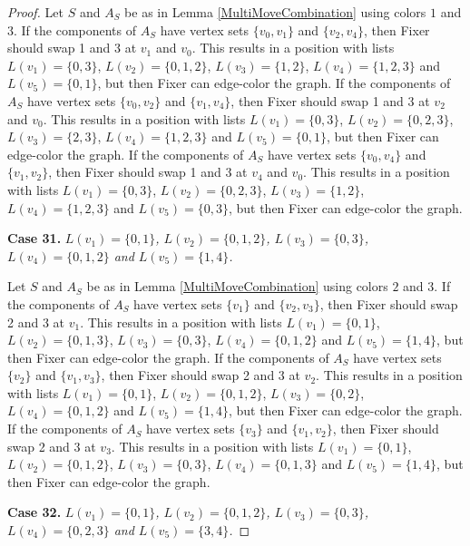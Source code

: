 \documentclass[12pt]{amsart}
\theoremstyle{plain}
\theoremstyle{definition}
\theoremstyle{remark}
\begin{document}
\begin{proof}
Let $S$ and $A_S$ be as in Lemma \ref{MultiMoveCombination} using colors $1$ and $3$. If the components of $A_S$ have vertex sets $\{v_0, v_1\}$ and $\{v_2, v_4\}$, then Fixer should swap 1 and 3 at $v_1$ and $v_0$. This results in a position with lists $L(v_1) = \{0, 3\}$, $L(v_2) = \{0, 1, 2\}$, $L(v_3) = \{1, 2\}$, $L(v_4) = \{1, 2, 3\}$ and $L(v_5) = \{0, 1\}$, but then Fixer can edge-color the graph.
If the components of $A_S$ have vertex sets $\{v_0, v_2\}$ and $\{v_1, v_4\}$, then Fixer should swap 1 and 3 at $v_2$ and $v_0$. This results in a position with lists $L(v_1) = \{0, 3\}$, $L(v_2) = \{0, 2, 3\}$, $L(v_3) = \{2, 3\}$, $L(v_4) = \{1, 2, 3\}$ and $L(v_5) = \{0, 1\}$, but then Fixer can edge-color the graph.
If the components of $A_S$ have vertex sets $\{v_0, v_4\}$ and $\{v_1, v_2\}$, then Fixer should swap 1 and 3 at $v_4$ and $v_0$. This results in a position with lists $L(v_1) = \{0, 3\}$, $L(v_2) = \{0, 2, 3\}$, $L(v_3) = \{1, 2\}$, $L(v_4) = \{1, 2, 3\}$ and $L(v_5) = \{0, 3\}$, but then Fixer can edge-color the graph.

\noindent\textbf{Case 31.  }\textit{$L(v_1) = \{0, 1\}$, $L(v_2) = \{0, 1, 2\}$, $L(v_3) = \{0, 3\}$, $L(v_4) = \{0, 1, 2\}$ and $L(v_5) = \{1, 4\}$.}

Let $S$ and $A_S$ be as in Lemma \ref{MultiMoveCombination} using colors $2$ and $3$. If the components of $A_S$ have vertex sets $\{v_1\}$ and $\{v_2, v_3\}$, then Fixer should swap 2 and 3 at $v_1$. This results in a position with lists $L(v_1) = \{0, 1\}$, $L(v_2) = \{0, 1, 3\}$, $L(v_3) = \{0, 3\}$, $L(v_4) = \{0, 1, 2\}$ and $L(v_5) = \{1, 4\}$, but then Fixer can edge-color the graph.
If the components of $A_S$ have vertex sets $\{v_2\}$ and $\{v_1, v_3\}$, then Fixer should swap 2 and 3 at $v_2$. This results in a position with lists $L(v_1) = \{0, 1\}$, $L(v_2) = \{0, 1, 2\}$, $L(v_3) = \{0, 2\}$, $L(v_4) = \{0, 1, 2\}$ and $L(v_5) = \{1, 4\}$, but then Fixer can edge-color the graph.
If the components of $A_S$ have vertex sets $\{v_3\}$ and $\{v_1, v_2\}$, then Fixer should swap 2 and 3 at $v_3$. This results in a position with lists $L(v_1) = \{0, 1\}$, $L(v_2) = \{0, 1, 2\}$, $L(v_3) = \{0, 3\}$, $L(v_4) = \{0, 1, 3\}$ and $L(v_5) = \{1, 4\}$, but then Fixer can edge-color the graph.

\noindent\textbf{Case 32.  }\textit{$L(v_1) = \{0, 1\}$, $L(v_2) = \{0, 1, 2\}$, $L(v_3) = \{0, 3\}$, $L(v_4) = \{0, 2, 3\}$ and $L(v_5) = \{3, 4\}$.}


\end{proof}
\end{document}
